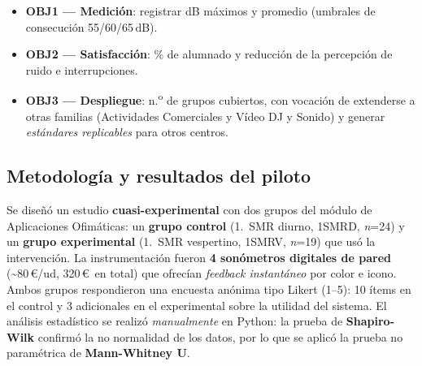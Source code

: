 \documentclass[11pt,a4paper]{article}
\begin{document}
\begin{itemize}[leftmargin=1.3em, itemsep=2pt, topsep=2pt]
  \item \textbf{OBJ1 --- Medici\'on}: registrar dB m\'aximos y promedio (umbrales de consecuci\'on 55/60/65\,dB).
  \item \textbf{OBJ2 --- Satisfacci\'on}: \% de alumnado y reducci\'on de la percepci\'on de ruido e interrupciones.
  \item \textbf{OBJ3 --- Despliegue}: n.\textsuperscript{o} de grupos cubiertos, con vocaci\'on de extenderse a otras familias (Actividades Comerciales y V\'ideo DJ y Sonido) y generar \emph{est\'andares replicables} para otros centros.
\end{itemize}

\subsection{Metodolog\'ia y resultados del piloto}
Se dise\~n\'o un estudio \textbf{cuasi-experimental} con dos grupos del m\'odulo de Aplicaciones Ofim\'aticas: un \textbf{grupo control} (1.\textordmasculine\ SMR diurno, 1SMRD, \emph{n}=24) y un \textbf{grupo experimental} (1.\textordmasculine\ SMR vespertino, 1SMRV, \emph{n}=19) que us\'o la intervenci\'on. La instrumentaci\'on fueron \textbf{4 son\'ometros digitales de pared} (\textasciitilde80\,\euro/ud, 320\,\euro\ en total) que ofrec\'ian \emph{feedback instant\'aneo} por color e icono. Ambos grupos respondieron una encuesta an\'onima tipo Likert (1--5): 10 \'items en el control y 3 adicionales en el experimental sobre la utilidad del sistema. El an\'alisis estad\'istico se realiz\'o \emph{manualmente} en Python: la prueba de \textbf{Shapiro-Wilk} confirm\'o la no normalidad de los datos, por lo que se aplic\'o la prueba no param\'etrica de \textbf{Mann-Whitney U}.
\end{document}
